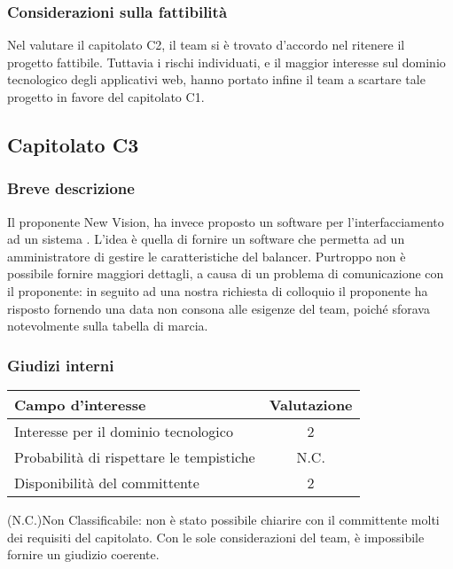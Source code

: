 \subsubsection{Considerazioni sulla fattibilità}
Nel valutare il capitolato C2, il team si è trovato d'accordo nel ritenere il progetto fattibile. Tuttavia i rischi individuati, e il maggior interesse sul dominio tecnologico degli applicativi web, hanno portato infine il team a scartare tale progetto in favore del capitolato C1.

\subsection{Capitolato C3}
\subsubsection{Breve descrizione}
Il proponente New Vision, ha invece proposto un software per l'interfacciamento ad un sistema . L'idea è quella di fornire un software che permetta ad un amministratore di gestire le caratteristiche del balancer. Purtroppo non è possibile fornire maggiori dettagli, a causa di un problema di comunicazione con il proponente: in seguito ad una nostra richiesta di colloquio il proponente ha risposto fornendo una data non consona alle esigenze del team, poiché sforava notevolmente sulla tabella di marcia.
\subsubsection{Giudizi interni}
\begin{center}
\begin{tabular}{lc}
\toprule
Campo d'interesse & Valutazione\\
\midrule %
Interesse per il dominio tecnologico & 2\\
Probabilità di rispettare le tempistiche & N.C.\\
Disponibilità del committente & 2\\
\bottomrule
\end{tabular}
\end{center}
(N.C.)Non Classificabile: non è stato possibile chiarire con il committente molti dei requisiti del capitolato. Con le sole considerazioni del team, è impossibile fornire un giudizio coerente.

